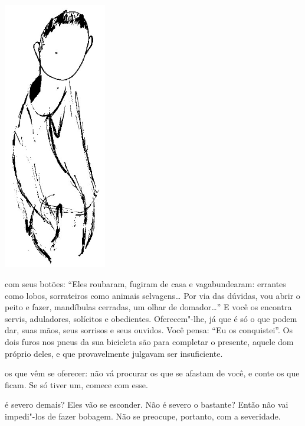 \begin{vplace}[1]
\begin{center}
\includegraphics[width=45mm]{./imgs/Image_2.jpg}
\end{center}
\end{vplace}

\pagebreak
\thispagestyle{empty}

\movetooddpage

 com seus botões: ``Eles roubaram, fugiram de casa e vagabundearam:
errantes como lobos, sorrateiros como animais selvagens\ldots{} Por via das
dúvidas, vou abrir o peito e fazer, mandíbulas cerradas, um olhar de
domador\ldots{}'' E você os encontra servis, aduladores, solícitos e
obedientes. Oferecem"-lhe, já que é só o que podem dar, suas mãos, seus
sorrisos e seus ouvidos. Você pensa: ``Eu os conquistei''. Os dois furos
nos pneus da sua bicicleta são para completar o presente, aquele dom
próprio deles, e que provavelmente julgavam ser insuficiente.




 os que vêm se oferecer: não vá procurar os que se afastam de
você, e conte os que ficam. Se só tiver um, comece com esse.




 é severo demais? Eles vão se esconder. Não é severo o bastante?
Então não vai impedi"-los de fazer bobagem. Não se preocupe, portanto,
com a severidade.




